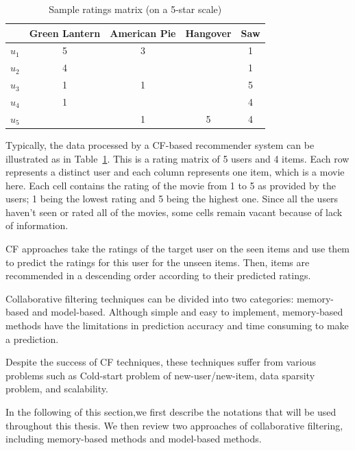 \documentclass[oneside,13pt]{extreport}
\begin{document}
\begin{table}[h!]
    \small\centering
    \begin{tabular}{|c|c|c|c|c|}
        \hline
         & Green Lantern & American Pie & Hangover & Saw   \\
        \hline \hline
        $u_1$ & 5 & 3 &  & 1 \\
        \hline
        $u_2$ & 4 &  &  & 1 \\
        \hline
        $u_3$ & 1 & 1 &  & 5 \\
        \hline
        $u_4$ & 1 &  &  & 4 \\
        \hline
        $u_5$ &  & 1 & 5 & 4 \\
        \hline
    \end{tabular}
    \caption{Sample ratings matrix (on a 5-star scale)}
    \label{tab:rating_matrix-1}
\end{table}
Typically, the data processed by a CF-based recommender system can be illustrated as in Table~\ref{tab:rating_matrix-1}. This is a rating matrix of 5 users and 4 items. Each row represents a distinct user and each column represents one item, which is a movie here. Each cell contains the rating of the movie from 1 to 5 as provided by the users; 1 being the lowest rating and 5 being the highest one. Since all the users haven't seen or rated all of the movies, some cells remain vacant because of lack of information. 

CF approaches take the ratings of the target user on the seen items and use them to predict the ratings for this user for the unseen items. Then, items are recommended in a descending order according to their predicted ratings.

Collaborative filtering techniques can be divided into two categories: memory-based and model-based. Although simple and easy to implement, memory-based methods have the limitations in prediction accuracy and time consuming to make a prediction. 

Despite the success of CF techniques, these techniques suffer from various problems such as Cold-start problem of new-user/new-item, data sparsity problem, and scalability.

In the following of this section,we first describe the notations that will be used throughout this thesis. We then review two approaches
of collaborative filtering, including memory-based methods and model-based methods.
\end{document}
